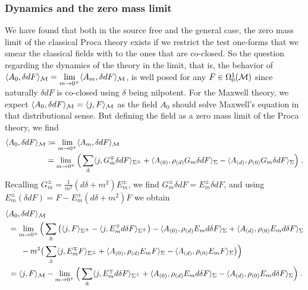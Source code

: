 \subsubsection{Dynamics and the zero mass limit}\label{sec:limit_dynamics_classical}
We have found that both in the source free and the general case, the zero mass limit of the classical Proca theory exists if we restrict the test one-forms that we smear the classical fields with to the ones that are co-closed. So the question regarding the dynamics of the theory in the limit, that is, the behavior of $\langle A_0 , \delta d F \rangle_{\mathcal{M}}= \lim\limits_{m \to 0^+} \langle A_m, \delta d F \rangle_{\mathcal{M}}$, is well posed for any $F \in \Omega^1_0(\mathcal{M})$ since naturally $\delta d F$ is co-closed using $\delta$ being nilpotent. For the Maxwell theory, we expect $\langle A_0 , \delta d F \rangle_{\mathcal{M}}= \langle j, F \rangle_{\mathcal{M}}$ as the field $A_0$ should solve Maxwell's equation in that distributional sense. But defining the field as a zero mass limit of the Proca theory, we find
\begin{align}
\langle A_0 , \delta d F \rangle_{\mathcal{M}}
&\coloneqq  \lim\limits_{m \to 0^+} \langle A_m, \delta d F \rangle_{\mathcal{M}} \\
&=  \lim\limits_{m \to 0^+}\Big( \sum\limits_\pm \langle j , G_m^\mp \delta d F   \rangle_{\Sigma^\pm} +\langle {A_{(0)}} , \rho_{(d)} G_m \delta d F \rangle_\Sigma
- \langle {A_{(d)}} , \rho_{(0)} G_m \delta d F \rangle_\Sigma \Big) \;.\notag
\end{align}
Recalling $G^\pm_m = \frac{1}{m^2}(d \delta + m^2) E^\pm_m$, we find $G^\pm_m \delta d F = E^\pm_m \delta d F$, and using $E_m^\pm (\delta d F) = F - E_m^\pm (d\delta + m^2) F$ we obtain
\begin{align}
	\langle &A_0 , \delta d F \rangle_{\mathcal{M}}  \\
&=  \lim\limits_{m \to 0^+}\Big( \sum\limits_\pm \big(  \langle j , F\rangle_{\Sigma^\pm} - \langle j ,  E_m^\mp d\delta F   \rangle_{\Sigma^\pm} \big)
		 -\langle {A_{(0)}} , \rho_{(d)} E_m d\delta  F \rangle_\Sigma
		+ \langle {A_{(d)}} , \rho_{(0)} E_m d\delta  F \rangle_\Sigma  \notag \\
		 &\phantom{=I} - m^2 \big(
		 \sum\limits_\pm \langle j , E_m^\mp F\rangle_{\Sigma^\pm}
				 + \langle {A_{(0)}} , \rho_{(d)} E_m  F \rangle_\Sigma
				  -\langle {A_{(d)}} , \rho_{(0)} E_m  F \rangle_\Sigma
		 \big)
		\Big)	\notag \\
&=	\langle j , F \rangle_{\mathcal{M}} - \lim\limits_{m \to 0^+}\Big(\sum\limits_\pm \langle j ,  E_m^\mp d\delta F   \rangle_{\Sigma^\pm}
+\langle {A_{(0)}} , \rho_{(d)} E_m d\delta  F \rangle_\Sigma
- \langle {A_{(d)}} , \rho_{(0)} E_m d\delta  F \rangle_\Sigma \Big) \;.		\notag
\end{align}
